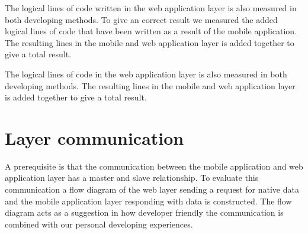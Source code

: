 The logical lines of code written in the web application layer is also measured in both developing methods. To give an correct result we measured the added logical lines of code that have been written as a result of the mobile application. The resulting lines in the mobile and web application layer is added together to give a total result. 

The logical lines of code in the web application layer is also measured in both developing methods. The resulting lines in the mobile and web application layer is added together to give a total result. 

\section{Layer communication} \label{section-layer-communication}
A prerequisite is that the communication between the mobile application and web application layer has a master and slave relationship. To evaluate this communication a flow diagram of the web layer sending a request for native data and the mobile application layer responding with data is constructed. The flow diagram acts as a suggestion in how developer friendly the communication is combined with our personal developing experiences.